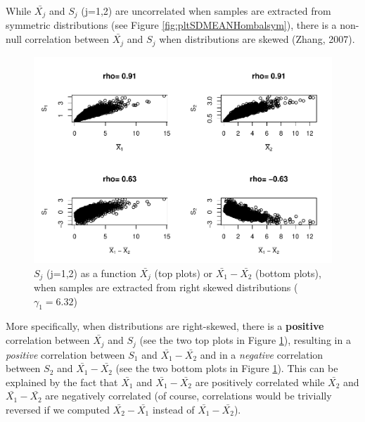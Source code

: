 \documentclass[
  english,
  man]{apa6}
\begin{document}
While \(\bar{X_j}\) and \(S_j\) (j=1,2) are uncorrelated when samples are extracted from symmetric distributions (see Figure \ref{fig:pltSDMEANHombalsym}), there is a non-null correlation between \(\bar{X_j}\) and \(S_j\) when distributions are skewed (Zhang, 2007).

\begin{figure}
\centering
\includegraphics{Correlation_files/figure-latex/pltSDHombalRskew-1.pdf}
\caption{\label{fig:pltSDHombalRskew}\(S_j\) (j=1,2) as a function \(\bar{X_j}\) (top plots) or \(\bar{X_1}-\bar{X_2}\) (bottom plots), when samples are extracted from right skewed distributions (\(\gamma_1 = 6.32\))}
\end{figure}

More specifically, when distributions are right-skewed, there is a \textbf{positive} correlation between \(\bar{X_j}\) and \(S_j\) (see the two top plots in Figure \ref{fig:pltSDHombalRskew}), resulting in a \emph{positive} correlation between \(S_1\) and \(\bar{X_1}-\bar{X_2}\) and in a \emph{negative} correlation between \(S_2\) and \(\bar{X_1}-\bar{X_2}\) (see the two bottom plots in Figure \ref{fig:pltSDHombalRskew}). This can be explained by the fact that \(\bar{X_1}\) and \(\bar{X_1}-\bar{X_2}\) are positively correlated while \(\bar{X_2}\) and \(\bar{X_1}-\bar{X_2}\) are negatively correlated (of course, correlations would be trivially reversed if we computed \(\bar{X_2}-\bar{X_1}\) instead of \(\bar{X_1}-\bar{X_2}\)).
\end{document}
